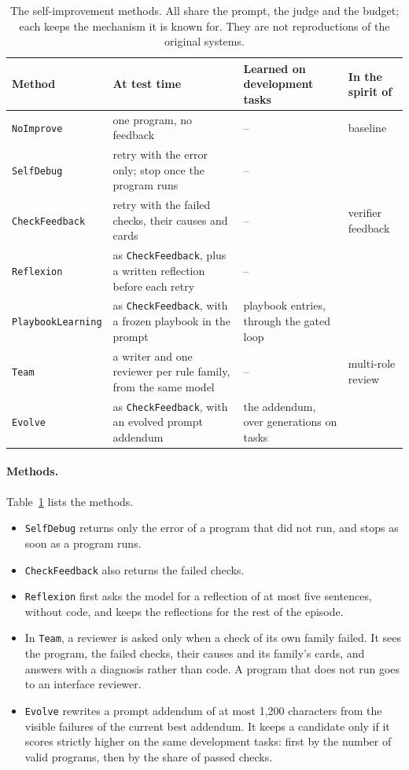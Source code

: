 \begin{table}[t]
\centering
\small
\setlength{\tabcolsep}{4pt}
\begin{tabular}{@{}lp{5.3cm}p{3.9cm}p{2.8cm}@{}}
\toprule
Method & At test time & Learned on development tasks & In the spirit of \\
\midrule
\texttt{NoImprove} & one program, no feedback & -- & baseline \\
\texttt{SelfDebug} & retry with the error only; stop once the program runs & -- &
\citet{chen2024selfdebug} \\
\texttt{CheckFeedback} & retry with the failed checks, their causes and cards & -- &
verifier feedback \\
\texttt{Reflexion} & as \texttt{CheckFeedback}, plus a written reflection before each retry &
-- & \citet{shinn2023reflexion} \\
\texttt{PlaybookLearning} & as \texttt{CheckFeedback}, with a frozen playbook in the prompt &
playbook entries, through the gated loop & \citet{zhao2024expel,suzgun2026dynamic} \\
\texttt{Team} & a writer and one reviewer per rule family, from the same model & -- &
multi-role review \\
\texttt{Evolve} & as \texttt{CheckFeedback}, with an evolved prompt addendum & the addendum,
over \EvolveGenerations{} generations on \EvolveMinibatch{} tasks & \citet{agrawal2026gepa} \\
\bottomrule
\end{tabular}
\caption{The \NMethods{} self-improvement methods. All share the prompt, the judge and the
budget; each keeps the mechanism it is known for. They are not reproductions of the original
systems.}
\label{tab:methods}
\end{table}

\paragraph{Methods.}
Table~\ref{tab:methods} lists the \NMethods{} methods.
\begin{itemize}
\item \texttt{SelfDebug} returns only the error of a program that did not run, and stops as
soon as a program runs.
\item \texttt{CheckFeedback} also returns the failed checks.
\item \texttt{Reflexion} first asks the model for a reflection of at most five sentences,
without code, and keeps the reflections for the rest of the episode.
\item In \texttt{Team}, a reviewer is asked only when a check of its own family failed. It sees
the program, the failed checks, their causes and its family's cards, and answers with a
diagnosis rather than code. A program that does not run goes to an interface reviewer.
\item \texttt{Evolve} rewrites a prompt addendum of at most 1,200 characters from the visible
failures of the current best addendum. It keeps a candidate only if it scores strictly higher
on the same development tasks: first by the number of valid programs, then by the share of
passed checks.
\end{itemize}

